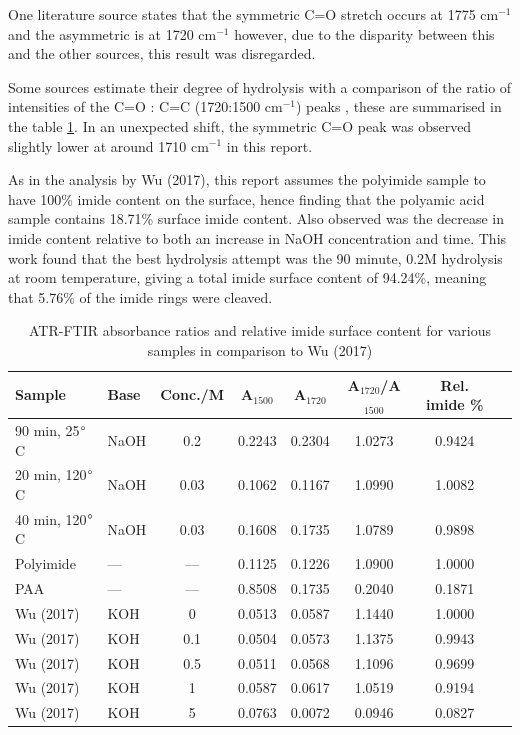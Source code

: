 One literature source \cite{chang2000two} states that the symmetric C=O stretch occurs at 1775 cm$^{-1}$ and the asymmetric is at 1720 cm$^{-1}$ however, due to the disparity between this and the other sources, this result was disregarded.


Some sources estimate their degree of hydrolysis with a comparison of the ratio of intensities of the C=O : C=C (1720:1500 cm$^{-1}$) peaks \cite{wu2017study,xue1986studies}, these are summarised in the table \ref{tab:irratio}. In an unexpected shift, the symmetric C=O peak was observed slightly lower at around 1710 cm$^{-1}$ in this report.

As in the analysis by Wu (2017)\cite{wu2017study}, this report assumes the polyimide sample to have 100\% imide content on the surface, hence finding that the polyamic acid sample contains 18.71\% surface imide content. Also observed was the decrease in imide content relative to both an increase in NaOH concentration and time. This work found that the best hydrolysis attempt was the 90 minute, 0.2M hydrolysis at room temperature, giving a total imide surface content of 94.24\%, meaning that 5.76\% of the imide rings were cleaved.

\begin{table}

\caption{ATR-FTIR absorbance ratios and relative imide surface content for various samples in comparison to Wu (2017)\cite{wu2017study}}
\centering
\begin{tabular}{llcccccc}
\hline
\textbf{Sample} & \textbf{Base} & \textbf{Conc./M} & \textbf{A$_{1500}$} & \textbf{A$_{1720}$} & \textbf{A$_{1720}$/A$_{1500}$} & \textbf{Rel. imide \%} \\
\hline
90 min, 25$\degree$C  & NaOH & 0.2  & 0.2243 & 0.2304 & 1.0273 & 0.9424 \\
20 min, 120$\degree$C   & NaOH & 0.03 & 0.1062 & 0.1167 & 1.0990 & 1.0082 \\
40 min, 120$\degree$C   & NaOH & 0.03 & 0.1608 & 0.1735 & 1.0789 & 0.9898 \\
Polyimide      & ---  & ---  & 0.1125 & 0.1226 & 1.0900 & 1.0000 \\
PAA         & ---  & ---  & 0.8508 & 0.1735 & 0.2040 & 0.1871 \\
\hline
Wu (2017)   & KOH  & 0    & 0.0513 & 0.0587 & 1.1440 & 1.0000 \\
Wu (2017)   & KOH  & 0.1  & 0.0504 & 0.0573 & 1.1375 & 0.9943 \\
Wu (2017)   & KOH  & 0.5  & 0.0511 & 0.0568 & 1.1096 & 0.9699 \\
Wu (2017)   & KOH  & 1    & 0.0587 & 0.0617 & 1.0519 & 0.9194 \\
Wu (2017)   & KOH  & 5    & 0.0763 & 0.0072 & 0.0946 & 0.0827 \\
\hline
\end{tabular}

\label{tab:irratio}

\end{table}


